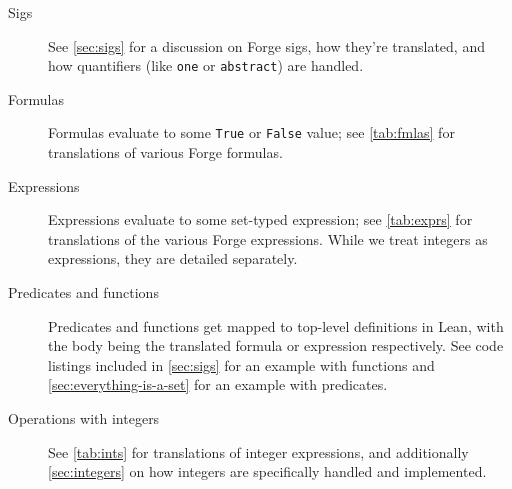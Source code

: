 \begin{description}
  \item[Sigs] See \cref{sec:sigs} for a discussion on Forge sigs, how they're translated, and how quantifiers (like \texttt{one} or \texttt{abstract}) are handled.
  \item[Formulas] Formulas evaluate to some \texttt{True} or \texttt{False} value; see \cref{tab:fmlas} for translations of various Forge formulas.
  \item[Expressions] Expressions evaluate to some set-typed expression; see \cref{tab:exprs} for translations of the various Forge expressions. While we treat integers as expressions, they are detailed separately. 
  \item[Predicates and functions] Predicates and functions get mapped to top-level definitions in Lean, with the body being the translated formula or expression respectively. See code listings included in \cref{sec:sigs} for an example with functions and \cref{sec:everything-is-a-set} for an example with predicates. 
  \item[Operations with integers] See \cref{tab:ints} for translations of integer expressions, and additionally \cref{sec:integers} on how integers are specifically handled and implemented. 
\end{description}


